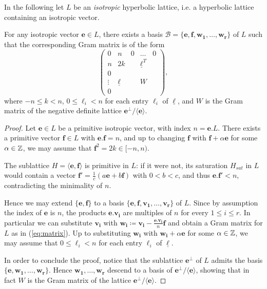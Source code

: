 \documentclass[11pt,letterpaper]{amsart}
\newcommand{\vect}[1]{\boldsymbol{#1}}
\begin{document}
In the following let $L$ be an \emph{isotropic} hyperbolic lattice, i.e. a hyperbolic lattice containing an isotropic vector.

\begin{lemma} \label{lemma:structure.lemma}
For any isotropic vector $\vect{e}\in L$, there exists a basis $\mathcal{B}=\{\vect{e},\vect{f},\vect{w_1},\ldots,\vect{w_r}\}$ of $L$ such that the corresponding Gram matrix is of the form
\begin{equation} \label{eq:matrix}
\left(\begin{array}{cc|ccc}
0 &n &0 &\ldots &0\\
n &2k & &\underline{\ell}^T &\\
\hline
0 & & & &\\
\vdots &\underline{\ell} & &W &\\
0 & & & &
\end{array}\right),
\end{equation}
where $-n\le k < n$, $0\le \ell_i < n$ for each entry $\ell_i$ of $\underline{\ell}$, and $W$ is the Gram matrix of the negative definite lattice $\vect{e}^\perp/\langle \vect{e}\rangle$.
\end{lemma}
\begin{proof}
Let $\vect{e}\in L$ be a primitive isotropic vector, with index $n=\vect{e}.L$. There exists a primitive vector $\vect{f}\in L$ with $\vect{e}.\vect{f}=n$, and up to changing $\vect{f}$ with $\vect{f}+\alpha \vect{e}$ for some $\alpha\in \mathbb{Z}$, we may assume that $\vect{f}^2=2k\in [-n,n)$.

The sublattice $H=\langle \vect{e},\vect{f}\rangle$ is primitive in $L$: if it were not, its saturation $H_{sat}$ in $L$ would contain a vector $\vect{f'}=\frac{1}{c}(a \vect{e}+b\vect{f})$ with $0<b<c$, and thus $\vect{e}.\vect{f'}<n$, contradicting the minimality of $n$.

Hence we may extend $\{\vect{e},\vect{f}\}$ to a basis $\{\vect{e},\vect{f},\vect{v_1},\ldots,\vect{v_r}\}$ of $L$. Since by assumption the index of $\vect{e}$ is $n$, the products $\vect{e}.\vect{v_i}$ are multiples of $n$ for every $1\le i\le r$. In particular we can substitute $\vect{v_i}$ with $\vect{w_i}\coloneqq \vect{v_i}- \frac{\vect{e}.\vect{v_i}}{n}\vect{f}$ and obtain a Gram matrix for $L$ as in (\ref{eq:matrix}). Up to substituting $\vect{w_i}$ with $\vect{w_i}+\alpha \vect{e}$ for some $\alpha\in \mathbb{Z}$, we may assume that $0\le \ell_i < n$ for each entry $\ell_i$ of $\underline{\ell}$.

In order to conclude the proof, notice that the sublattice $\vect{e}^\perp$ of $L$ admits the basis $\{\vect{e},\vect{w_1},\ldots,\vect{w_r}\}$. Hence $\vect{w_1},\ldots,\vect{w_r}$ descend to a basis of $\vect{e}^\perp /\langle \vect{e}\rangle$, showing that in fact $W$ is the Gram matrix of the lattice $ \vect{e}^\perp / \langle \vect{e}\rangle$.
\end{proof}
\end{document}
